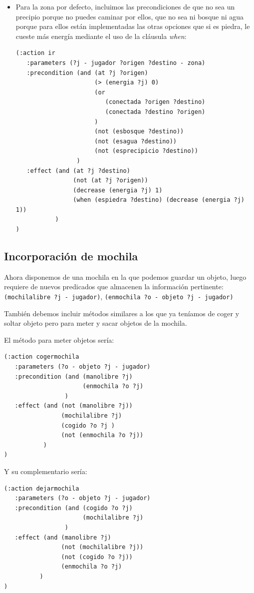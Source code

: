 \documentclass[a4paper, 11pt]{article}
\begin{document}
\begin{itemize}
			\item Para la zona por defecto, incluimos las precondiciones de que no sea un precipio porque no puedes
			caminar por ellos, que no sea ni bosque ni agua porque para ellos están implementadas las otras opciones
			que si es piedra, le cueste más energía mediante el uso de la cláusula \textit{when}:
			\begin{verbatim}
(:action ir
   :parameters (?j - jugador ?origen ?destino - zona)
   :precondition (and (at ?j ?origen)
                      (> (energia ?j) 0)
                      (or
                         (conectada ?origen ?destino)
                         (conectada ?destino ?origen)
                      )
                      (not (esbosque ?destino))
                      (not (esagua ?destino))
                      (not (esprecipicio ?destino))
                 )
   :effect (and (at ?j ?destino)
                (not (at ?j ?origen))
                (decrease (energia ?j) 1)
                (when (espiedra ?destino) (decrease (energia ?j) 1))
           )
)
			\end{verbatim}
		\end{itemize}

	\subsection{Incorporación de mochila}
		Ahora disponemos de una mochila en la que podemos guardar un objeto, luego requiere de nuevos
		predicados que almacenen la información pertinente: \verb|(mochilalibre ?j - jugador)|,
		\verb|(enmochila ?o - objeto ?j - jugador)|
		
		También debemos incluir métodos similares a los que ya teníamos de coger y soltar objeto pero
		para meter y sacar objetos de la mochila.
		
		El método para meter objetos sería:
		\begin{verbatim}
(:action cogermochila
   :parameters (?o - objeto ?j - jugador)
   :precondition (and (manolibre ?j)
                      (enmochila ?o ?j)
                 )
   :effect (and (not (manolibre ?j))
                (mochilalibre ?j)
                (cogido ?o ?j )
                (not (enmochila ?o ?j))
           )
)
		\end{verbatim}
		
		Y su complementario sería:
		\begin{verbatim}
(:action dejarmochila
   :parameters (?o - objeto ?j - jugador)
   :precondition (and (cogido ?o ?j)
                      (mochilalibre ?j)
                 )
   :effect (and (manolibre ?j)
                (not (mochilalibre ?j))
                (not (cogido ?o ?j))
                (enmochila ?o ?j)
          )
)
		\end{verbatim}
\end{document}

